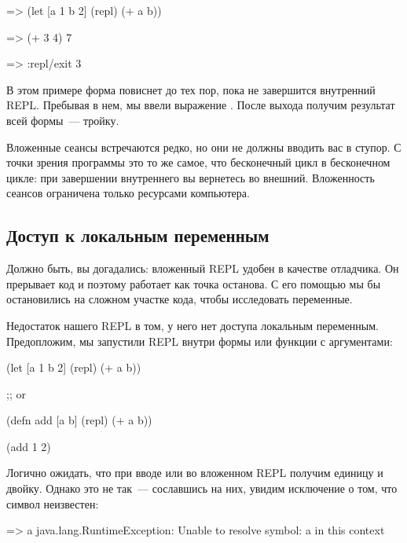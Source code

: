 \begin{english}
  \begin{clojure}
=> (let [a 1 b 2] (repl) (+ a b))

=> (+ 3 4)
7

=> :repl/exit
3
  \end{clojure}
\end{english}

В этом примере форма  повиснет до тех пор, пока не завершится внутренний REPL. Пребывая в нем, мы ввели выражение . После выхода получим результат всей формы~--- тройку.

Вложенные сеансы встречаются редко, но они не должны вводить вас в ступор. С точки зрения программы это то же самое, что бесконечный цикл в бесконечном цикле: при завершении внутреннего вы вернетесь во внешний. Вложенность сеансов ограничена только ресурсами компьютера.

\subsection{Доступ к локальным переменным}

Должно быть, вы догадались: вложенный REPL удобен в качестве отладчика. Он прерывает код и поэтому работает как точка останова. С его помощью мы бы остановились на сложном участке кода, чтобы исследовать переменные.

Недостаток нашего REPL в том, у него нет доступа локальным переменным. Предопложим, мы запустили REPL внутри формы  или функции с аргументами:

\begin{english}
  \begin{clojure}
(let [a 1 b 2]
  (repl)
  (+ a b))

;; or

(defn add [a b]
  (repl)
  (+ a b))

(add 1 2)
  \end{clojure}
\end{english}

Логично ожидать, что при вводе  или  во вложенном REPL получим единицу и двойку. Однако это не так~--- сославшись на них, увидим исключение о том, что символ неизвестен:

\begin{english}
  \begin{clojure}
=> a
java.lang.RuntimeException: Unable to resolve symbol: a in this context
  \end{clojure}
\end{english}

